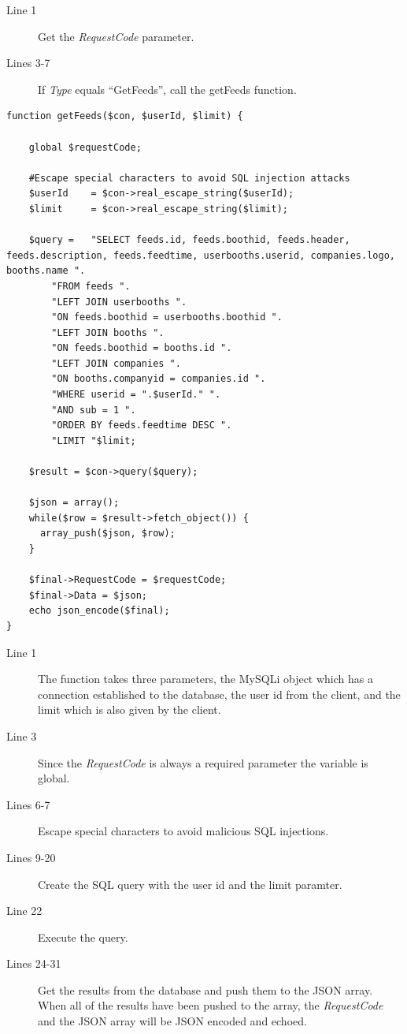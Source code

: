 \begin{description}
\item[Line 1] Get the \textit{RequestCode} parameter.
\item[Lines 3-7] If \textit{Type} equals ``GetFeeds'', call the getFeeds function.
\end{description}


\begin{lstlisting}[language=phpstyle, label=lst:getFeeds, caption={getFeeds function}]
function getFeeds($con, $userId, $limit) {

    global $requestCode;

    #Escape special characters to avoid SQL injection attacks
    $userId    = $con->real_escape_string($userId);
    $limit     = $con->real_escape_string($limit);

    $query =   "SELECT feeds.id, feeds.boothid, feeds.header, feeds.description, feeds.feedtime, userbooths.userid, companies.logo, booths.name ".
        "FROM feeds ".
        "LEFT JOIN userbooths ".
        "ON feeds.boothid = userbooths.boothid ".
        "LEFT JOIN booths ".
        "ON feeds.boothid = booths.id ".
        "LEFT JOIN companies ".
        "ON booths.companyid = companies.id ".
        "WHERE userid = ".$userId." ".
        "AND sub = 1 ".
        "ORDER BY feeds.feedtime DESC ".
        "LIMIT "$limit;

    $result = $con->query($query);

    $json = array();
    while($row = $result->fetch_object()) {
      array_push($json, $row);
    }
    
    $final->RequestCode = $requestCode;
    $final->Data = $json;
    echo json_encode($final);
}
\end{lstlisting}

\begin{description}
\item[Line 1] The function takes three parameters, the MySQLi object which has a connection
  established to the database, the user id from the client, and the limit which is also given by the client.
\item[Line 3] Since the \textit{RequestCode} is always a required parameter the variable is global.
\item[Lines 6-7] Escape special characters to avoid malicious SQL injections.
\item[Lines 9-20] Create the SQL query with the user id and the limit paramter.
\item[Line 22] Execute the query.
\item[Lines 24-31] Get the results from the database and push them to the JSON array. When
  all of the results have been pushed to the array, the \textit{RequestCode} and the JSON array will be JSON encoded and echoed.
\end{description}


